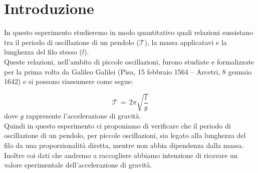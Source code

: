 \section{Introduzione}


In questo esperimento studieremo in modo quantitativo quali relazioni sussistano tra il periodo di oscillazione di un pendolo ($\mathcal{T}$), la massa applicatavi e la lunghezza del filo stesso ($l$).\\
Queste relazioni, nell'ambito di piccole oscillazioni, furono studiate e formalizzate per la prima volta da Galileo Galilei (Pisa, 15 febbraio 1564 – Arcetri, 8 gennaio 1642) e si possono riassumere come segue:

\begin{equation}
	\mathcal{T} \,=\, 2\pi\sqrt{\frac{l}{g}} 
\end{equation}
%
dove $g$ rappresente l'accelerazione di gravità.\\
Quindi in questo esperimento ci proponiamo di verificare che il periodo di oscillazione di un pendolo, per piccole oscillazioni, sia legato alla lunghezza del filo da una proporzionalità diretta, mentre non abbia dipendenza dalla massa.
Inoltre coi dati che andremo a raccogliere abbiamo intenzione di ricavare un valore sperimentale dell'accelerazione di gravità.